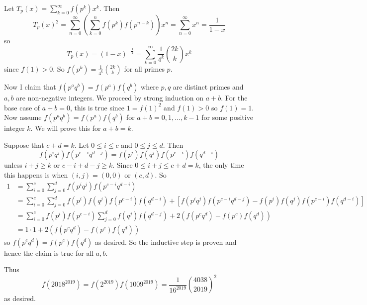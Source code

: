 Let $T_p\left(x\right)=\displaystyle\sum_{k=0}^{\infty}f\left(p^k\right)x^k$. Then \[T_p\left(x\right)^2=\displaystyle\sum_{n=0}^{\infty}\left(\displaystyle\sum_{k=0}^nf\left(p^k\right)f\left(p^{n-k}\right)\right)x^n=\displaystyle\sum_{n=0}^{\infty}x^n=\frac{1}{1-x}\] so \[T_p\left(x\right)=\left(1-x\right)^{-\frac{1}{2}}=\displaystyle\sum_{k=0}^{\infty}\frac{1}{4^k}\binom{2k}{k}x^k\] since $f\left(1\right)>0$. So $f\left(p^k\right)=\frac{1}{4^k}\binom{2k}{k}$ for all primes $p$.

Now I claim that $f\left(p^aq^b\right)=f\left(p^a\right)f\left(q^b\right)$ where $p,q$ are distinct primes and $a,b$ are non-negative integers. We proceed by strong induction on $a+b$. For the base case of $a+b=0$, this is true since $1=f\left(1\right)^2$ and $f\left(1\right)>0$ so $f\left(1\right)=1$. Now assume $f\left(p^aq^b\right)=f\left(p^a\right)f\left(q^b\right)$ for $a+b=0,1,\ldots,k-1$ for some positive integer $k$. We will prove this for $a+b=k$.

Suppose that $c+d=k$. Let $0\leq i\leq c$ and $0\leq j\leq d$. Then \[f\left(p^iq^j\right)f\left(p^{c-i}q^{d-j}\right)=f\left(p^i\right)f\left(q^j\right)f\left(p^{c-i}\right)f\left(q^{d-i}\right)\] unless $i+j\geq k$ or $c-i+d-j\geq k$. Since $0\leq i+j\leq c+d=k$, the only time this happens is when $\left(i,j\right)=\left(0,0\right)$ or $\left(c,d\right)$. So
\begin{align*}
1&=\displaystyle\sum_{i=0}^c\displaystyle\sum_{j=0}^df\left(p^iq^j\right)f\left(p^{c-i}q^{d-i}\right)\\
&=\displaystyle\sum_{i=0}^c\displaystyle\sum_{j=0}^df\left(p^i\right)f\left(q^j\right)f\left(p^{c-i}\right)f\left(q^{d-i}\right)+\left[f\left(p^iq^j\right)f\left(p^{c-i}q^{d-j}\right)-f\left(p^i\right)f\left(q^j\right)f\left(p^{c-i}\right)f\left(q^{d-i}\right)\right]\\
&=\displaystyle\sum_{i=0}^cf\left(p^i\right)f\left(p^{c-i}\right)\displaystyle\sum_{j=0}^df\left(q^j\right)f\left(q^{d-j}\right)+2\left(f\left(p^cq^d\right)-f\left(p^c\right)f\left(q^d\right)\right)\\
&=1\cdot 1+2\left(f\left(p^cq^d\right)-f\left(p^c\right)f\left(q^d\right)\right)
\end{align*}
so $f\left(p^cq^d\right)=f\left(p^c\right)f\left(q^d\right)$ as desired. So the inductive step is proven and hence the claim is true for all $a,b$.

Thus \[f\left(2018^{2019}\right)=f\left(2^{2019}\right)f\left(1009^{2019}\right)=\boxed{\frac{1}{16^{2019}}\binom{4038}{2019}^2}\] as desired.